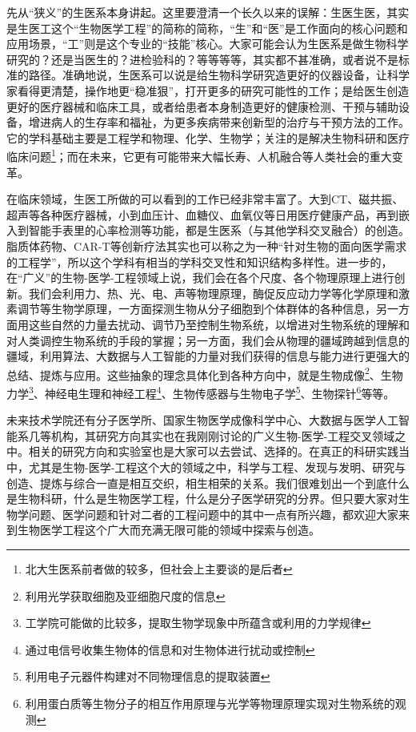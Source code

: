 先从“狭义”的生医系本身讲起。这里要澄清一个长久以来的误解：生医生医，其实是生医工这个“生物医学工程”的简称的简称，“生”和“医”是工作面向的核心问题和应用场景，“工”则是这个专业的“技能”核心。大家可能会认为生医系是做生物科学研究的？还是当医生的？进检验科的？等等等等，其实都不甚准确，或者说不是标准的路径。准确地说，生医系可以说是给生物科学研究造更好的仪器设备，让科学家看得更清楚，操作地更“稳准狠”，打开更多的研究可能性的工作；是给医生创造更好的医疗器械和临床工具，或者给患者本身制造更好的健康检测、干预与辅助设备，增进病人的生存率和福祉，为更多疾病带来创新型的治疗与干预方法的工作。它的学科基础主要是工程学和物理、化学、生物学；关注的是解决生物科研和医疗临床问题\footnote{北大生医系前者做的较多，但社会上主要谈的是后者}；而在未来，它更有可能带来大幅长寿、人机融合等人类社会的重大变革。

\vspace{10pt}

在临床领域，生医工所做的可以看到的工作已经非常丰富了。大到CT、磁共振、超声等各种医疗器械，小到血压计、血糖仪、血氧仪等日用医疗健康产品，再到嵌入到智能手表里的心率检测等功能，都是生医系（与其他学科交叉融合）的创造。脂质体药物、CAR-T等创新疗法其实也可以称之为一种“针对生物的面向医学需求的工程学”，所以这个学科有相当的学科交叉性和知识结构多样性。进一步的，在“广义”的生物-医学-工程领域上说，我们会在各个尺度、各个物理原理上进行创新。我们会利用力、热、光、电、声等物理原理，酶促反应动力学等化学原理和激素调节等生物学原理，一方面探测生物从分子细胞到个体群体的各种信息，另一方面用这些自然的力量去扰动、调节乃至控制生物系统，以增进对生物系统的理解和对人类调控生物系统的手段的掌握；另一方面，我们会从物理的疆域跨越到信息的疆域，利用算法、大数据与人工智能的力量对我们获得的信息与能力进行更强大的总结、提炼与应用。这些抽象的理念具体化到各种方向中，就是生物成像\footnote{利用光学获取细胞及亚细胞尺度的信息}、生物力学\footnote{工学院可能做的比较多，提取生物学现象中所蕴含或利用的力学规律}、神经电生理和神经工程\footnote{通过电信号收集生物体的信息和对生物体进行扰动或控制}、生物传感器与生物电子学\footnote{利用电子元器件构建对不同物理信息的提取装置}、生物探针\footnote{利用蛋白质等生物分子的相互作用原理与光学等物理原理实现对生物系统的观测}等等。

\vspace{10pt}

未来技术学院还有分子医学所、国家生物医学成像科学中心、大数据与医学人工智能系几等机构，其研究方向其实也在我刚刚讨论的广义生物-医学-工程交叉领域之中。相关的研究方向和实验室也是大家可以去尝试、选择的。在真正的科研实践当中，尤其是生物-医学-工程这个大的领域之中，科学与工程、发现与发明、研究与创造、提炼与综合一直是相互交织，相生相荣的关系。我们很难划出一个到底什么是生物科研，什么是生物医学工程，什么是分子医学研究的分界。但只要大家对生物学问题、医学问题和针对二者的工程问题中的其中一点有所兴趣，都欢迎大家来到生物医学工程这个广大而充满无限可能的领域中探索与创造。

